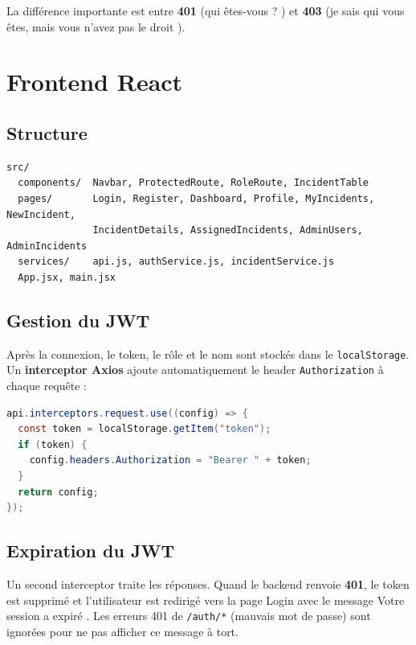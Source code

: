 \documentclass{rapportENSET}
\begin{document}
La diff\'erence importante est entre \textbf{401} (\og qui \^etes-vous ? \fg) et \textbf{403} (\og je sais qui vous \^etes, mais vous n'avez pas le droit \fg).

\section{Frontend React}

\subsection{Structure}

\begin{lstlisting}
src/
  components/  Navbar, ProtectedRoute, RoleRoute, IncidentTable
  pages/       Login, Register, Dashboard, Profile, MyIncidents, NewIncident,
               IncidentDetails, AssignedIncidents, AdminUsers, AdminIncidents
  services/    api.js, authService.js, incidentService.js
  App.jsx, main.jsx
\end{lstlisting}

\subsection{Gestion du JWT}

Apr\`es la connexion, le token, le r\^ole et le nom sont stock\'es dans le \texttt{localStorage}. Un \textbf{interceptor Axios} ajoute automatiquement le header \texttt{Authorization} \`a chaque requ\^ete :

\begin{lstlisting}[language=Java]
api.interceptors.request.use((config) => {
  const token = localStorage.getItem("token");
  if (token) {
    config.headers.Authorization = "Bearer " + token;
  }
  return config;
});
\end{lstlisting}

\subsection{Expiration du JWT}

Un second interceptor traite les r\'eponses. Quand le backend renvoie \textbf{401}, le token est supprim\'e et l'utilisateur est redirig\'e vers la page Login avec le message \og Votre session a expir\'e \fg. Les erreurs 401 de \texttt{/auth/*} (mauvais mot de passe) sont ignor\'ees pour ne pas afficher ce message \`a tort.
\end{document}
